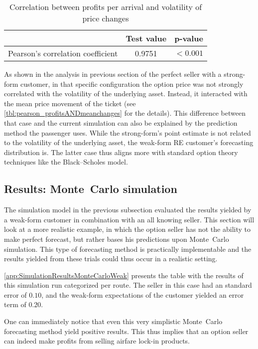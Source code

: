 
\begin{table}
\centering
\begin{tabular}{l c c}
\toprule
~  &  Test value  &  p-value  \\
\midrule
Pearson's correlation coefficient   &  0.9751  &  $< 0.001$ \\
\bottomrule
\end{tabular}
\caption{Correlation between profits per arrival and volatility of price changes}
\label{tbl:pearson_profitsANDstdchanges}
\end{table}


As shown in the analysis in previous section of the perfect seller with a strong-form customer, in that specific configuration the option price was not strongly correlated with the volatility of the underlying asset. Instead, it interacted with the mean price movement of the ticket (see \autoref{tbl:pearson_profitsANDmeanchanges} for the details). This difference between that case and the current simulation can also be explained by the prediction method the passenger uses. While the strong-form's point estimate is not related to the volatility of the underlying asset, the weak-form RE customer's forecasting distribution is. The latter case thus aligns more with standard option theory techniques like the Black--Scholes model.

\subsection{Results: Monte~Carlo simulation}
The simulation model in the previous subsection evaluated the results yielded by a weak-form customer in combination with an all knowing seller. This section will look at a more realistic example, in which the option seller has not the ability to make perfect forecast, but rather bases his predictions upon Monte~Carlo simulation. This type of forecasting method is practically implementable and the results yielded from these trials could thus occur in a realistic setting.

\autoref{app:SimulationResultsMonteCarloWeak} presents the table with the results of this simulation run categorized per route. The seller in this case had an standard error of $0.10$, and the weak-form expectations of the customer yielded an error term of $0.20$.

One can immediately notice that even this very simplistic Monte~Carlo forecasting method yield positive results. This thus implies that an option seller can indeed make profits from selling airfare lock-in products.

